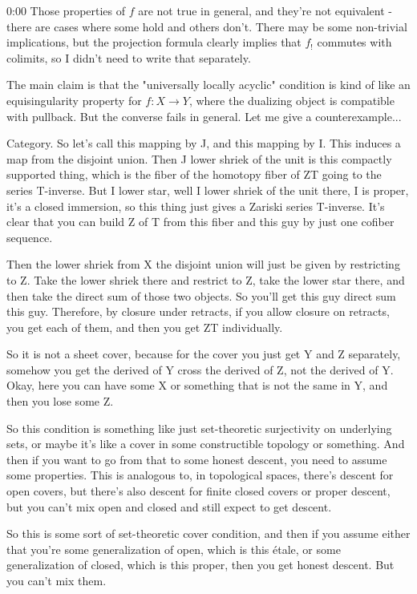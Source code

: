 \begin{unfinished}{0:00}
Those properties of $f$ are not true in general, and they're not equivalent - there are cases where some hold and others don't. There may be some non-trivial implications, but the projection formula clearly implies that $f_!$ commutes with colimits, so I didn't need to write that separately.

The main claim is that the "universally locally acyclic" condition is kind of like an equisingularity property for $f: X \to Y$, where the dualizing object is compatible with pullback. But the converse fails in general. Let me give a counterexample...


Category. So let's call this mapping by J, and this mapping by I. This induces a map from the disjoint union. Then J lower shriek of the unit is this compactly supported thing, which is the fiber of the homotopy fiber of ZT going to the series T-inverse. But I lower star, well I lower shriek of the unit there, I is proper, it's a closed immersion, so this thing just gives a Zariski series T-inverse. It's clear that you can build Z of T from this fiber and this guy by just one cofiber sequence.

Then the lower shriek from X the disjoint union will just be given by restricting to Z. Take the lower shriek there and restrict to Z, take the lower star there, and then take the direct sum of those two objects. So you'll get this guy direct sum this guy. Therefore, by closure under retracts, if you allow closure on retracts, you get each of them, and then you get ZT individually.

So it is not a sheet cover, because for the cover you just get Y and Z separately, somehow you get the derived of Y cross the derived of Z, not the derived of Y. Okay, here you can have some X or something that is not the same in Y, and then you lose some Z. 

So this condition is something like just set-theoretic surjectivity on underlying sets, or maybe it's like a cover in some constructible topology or something. And then if you want to go from that to some honest descent, you need to assume some properties. This is analogous to, in topological spaces, there's descent for open covers, but there's also descent for finite closed covers or proper descent, but you can't mix open and closed and still expect to get descent.

So this is some sort of set-theoretic cover condition, and then if you assume either that you're some generalization of open, which is this étale, or some generalization of closed, which is this proper, then you get honest descent. But you can't mix them.


\end{unfinished}
